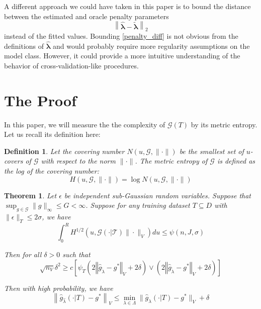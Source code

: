 \documentclass[12pt]{article}
\newtheorem{theorem}{Theorem}
\newtheorem{definition}{Definition}
\begin{document}
A different approach we could have taken in this paper is to bound the distance between the estimated and oracle penalty parameters
\begin{equation}
\label{penalty_diff}
\left \| \hat{\boldsymbol \lambda} - \tilde{\boldsymbol \lambda} \right \|_2
\end{equation}
instead of the fitted values. Bounding \ref{penalty_diff} is not obvious from the definitions of $\hat{\boldsymbol{\lambda}}$ and would probably require more regularity assumptions on the model class. However, it could provide a more intuitive understanding of the behavior of cross-validation-like procedures.

\section{The Proof} \label{sec:proofs}

In this paper, we will measure the the complexity of $\mathcal{G}(T)$ by its metric entropy. Let us recall its definition here:

\begin{definition}
Let the covering number $N(u, \mathcal{G}, \| \cdot \|)$ be the smallest set of $u$-covers of $\mathcal{G}$ with respect to the norm $\| \cdot \|$. The metric entropy of $\mathcal{G}$ is defined as the log of the covering number:
\begin{equation}
H (u, \mathcal{G}, \| \cdot \| ) = \log N(u, \mathcal{G}, \| \cdot \|)
\end{equation}
\end{definition}

\begin{theorem}
\label{train_val_thrm_complicated}
Let $\epsilon$ be independent sub-Gaussian random variables.
Suppose that $\sup_{g \in \mathcal{G}} \| g \|_\infty \le G < \infty$.
Suppose for any training dataset $T \subseteq D$ with $\| \epsilon \|_T \le 2 \sigma$, we have
\begin{equation}
\int_0^R H^{1/2} \left ( u, \mathcal{G(\cdot | T)} \| \cdot \|_V \right ) du \le \psi(n, J, \sigma)
\end{equation}

Then for all $\delta  > 0$ such that
\begin{equation}
\sqrt{n_{V}}\delta^{2}
\ge
c \left[
\psi_{T}\left(2\left\Vert \hat{g}_{\tilde{\lambda}}-g^{*}\right\Vert _{V} + 2\delta\right)
\vee
\left(2\left\Vert \hat{g}_{\tilde{\lambda}}-g^{*}\right\Vert _{V}+2\delta\right)
\right]
\end{equation}

Then with high probability, we have
\begin{equation}
\left \|\hat{g}_{\hat{\lambda} }(\cdot | T) - g^* \right \|_V
\le
\min_{\lambda \in \Lambda}\| \hat{g}_{\lambda}(\cdot | T) - g^*\|_V
+ \delta
\end{equation}
\end{theorem}
\end{document}
